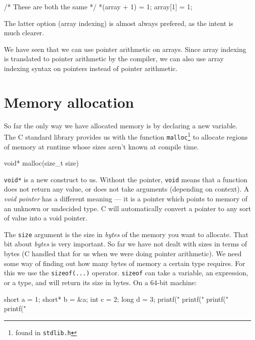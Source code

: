 \begin{codeblock}
/* These are both the same */
*(array + 1) = 1;
array[1] = 1; 
\end{codeblock}

The latter option (array indexing) is almost always prefered, as the intent is much clearer.

We have seen that we can use pointer arithmetic on arrays.
Since array indexing is translated to pointer arithmetic by the compiler, we can also use array indexing syntax on pointers instead of pointer arithmetic.

\section{Memory allocation}

So far the only way we have allocated memory is by declaring a new variable.
The C standard library provides us with the function \lstinline!malloc!\footnote{found in \lstinline{stdlib.h}} to allocate regions of memory at runtime whose sizes aren't known at compile time.

\begin{codeinline}
void* malloc(size_t size)
\end{codeinline}

\lstinline!void*! is a new construct to us.
Without the pointer, \lstinline!void! means that a function does not return any value, or does not take arguments (depending on context).
A \emph{void pointer} has a different meaning --- it is a pointer which points to memory of an unknown or undecided type.
C will automatically convert a pointer to any sort of value into a void pointer.

The \texttt{size} argument is the size in \emph{bytes} of the memory you want to allocate.
That bit about \emph{bytes} is very important.
So far we have not dealt with sizes in terms of bytes (C handled that for us when we were doing pointer arithmetic).
We need some way of finding out how many bytes of memory a certain type requires.
For this we use the \lstinline!sizeof(...)! operator.
\lstinline!sizeof! can take a variable, an expression, or a type, and will return its size in bytes.
On a 64-bit machine:

\begin{codeblock}
short a = 1;
short* b = &a;
int c = 2;
long d = 3;
printf("%
printf("%
printf("%
printf("%
\end{codeblock}

